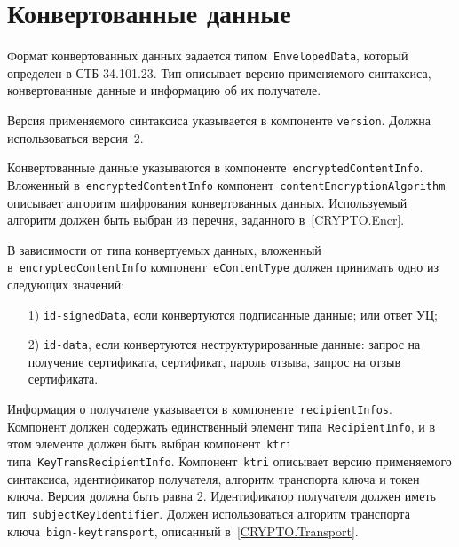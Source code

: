 
\section{Конвертованные данные}\label{FMT.EnvelopedData}

Формат конвертованных данных задается типом~\texttt{EnvelopedData}, который
определен в СТБ 34.101.23. Тип описывает версию применяемого синтаксиса,
конвертованные данные и информацию об их получателе.

Версия применяемого синтаксиса указывается в компоненте
\texttt{version}. Должна использоваться версия~$2$.

Конвертованные данные указываются в компоненте~\texttt{encryptedContentInfo}.
%
Вложенный в~\texttt{encryptedContentInfo} компонент~\texttt{contentEncryptionAlgorithm}
описывает алгоритм шифрования конвертованных данных. Используемый алгоритм 
должен быть выбран из перечня, заданного в~\ref{CRYPTO.Encr}.

В зависимости от типа конвертуемых данных, вложенный 
в~\texttt{encryptedContentInfo} компонент~\texttt{eContentType} 
должен принимать одно из следующих значений:
\begin{enumerate}
\item[1)]
\texttt{id-signedData}, если конвертуются подписанные данные;
или ответ УЦ; 
\item[2)]
\texttt{id-data}, если конвертуются неструктурированные данные:
запрос на получение сертификата,
сертификат, пароль отзыва, запрос на отзыв сертификата. 
\end{enumerate}



Информация о получателе указывается в компоненте~\texttt{recipientInfos}.
Компонент должен содержать единственный элемент 
типа~\texttt{RecipientInfo}, и в этом элементе должен быть выбран  
компонент~\texttt{ktri} типа~\texttt{KeyTransRecipientInfo}.  
Компонент~\texttt{ktri} описывает версию применяемого синтаксиса, 
идентификатор получателя, алгоритм транспорта ключа и токен ключа. 
Версия должна быть равна 2. Идентификатор получателя должен 
иметь тип~\texttt{subjectKeyIdentifier}. Должен использоваться алгоритм 
транспорта ключа~\texttt{bign-keytransport}, описанный 
в~\ref{CRYPTO.Transport}. 


